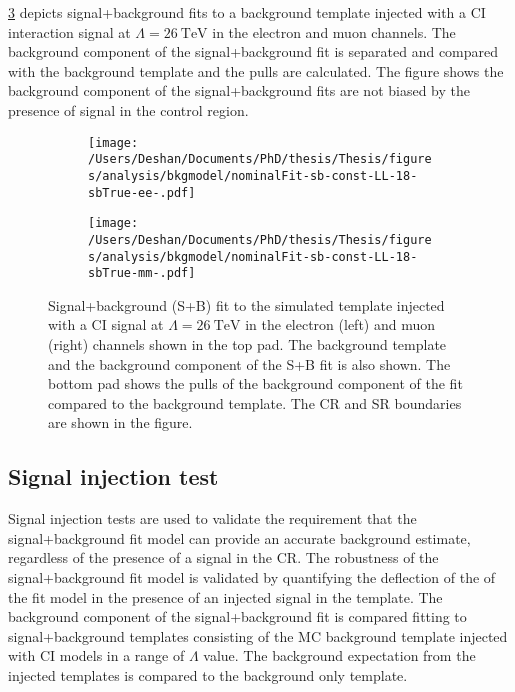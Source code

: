 \cref{fig:bkgmodel:sbfits} depicts signal+background fits to a background template injected with a CI interaction signal at $\Lambda = \SI{26}{\tera\electronvolt}$ in the electron and muon channels. The background component of the signal+background fit is separated and compared with the background template and the pulls are calculated. The figure shows the background component of the signal+background fits are not biased by the presence of signal in the control region. 
\begin{figure}[h!]
    \centering
    \begin{subfigure}[b]{0.49\textwidth}
        \centering
        \texttt{[image: /Users/Deshan/Documents/PhD/thesis/Thesis/figures/analysis/bkgmodel/nominalFit-sb-const-LL-18-sbTrue-ee-.pdf]}
        \label{fig:bkgmodel:sbfits1}
    \end{subfigure}
    \begin{subfigure}[b]{0.49\textwidth}
        \centering
        \texttt{[image: /Users/Deshan/Documents/PhD/thesis/Thesis/figures/analysis/bkgmodel/nominalFit-sb-const-LL-18-sbTrue-mm-.pdf]}
        \label{fig:bkgmodel:sbfits2}
    \end{subfigure}
    \caption[Signal+Background fits to the signal+background template in the electron and muon channels]{Signal+background (S+B) fit to the simulated template injected with a CI signal at $\Lambda = \SI{26}{\tera\electronvolt}$ in the electron (left) and muon (right) channels shown in the top pad. The background template and the background component of the S+B fit is also shown. The bottom pad shows the pulls of the background component of the fit compared to the background template. The CR and SR boundaries are shown in the figure.}
    \label{fig:bkgmodel:sbfits}
\end{figure}

\subsection{Signal injection test}\label{sec:extrap:recovery}
Signal injection tests are used to validate the requirement that the signal+background fit model can provide an accurate background estimate, regardless of the presence of a signal in the CR. The robustness of the signal+background fit model is validated by quantifying the deflection of the of the fit model in the presence of an injected signal in the template. The background component of the signal+background fit is compared fitting to signal+background templates consisting of the MC background template injected with CI models in a range of $\Lambda$ value. The background expectation from the injected templates is compared to the background only template. 

